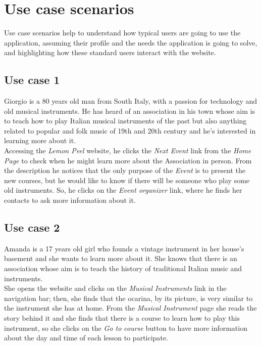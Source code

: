 \documentclass[../../DD.tex]{subfiles}
\begin{document}
	\section{Use case scenarios}
		Use case scenarios help to understand how typical users are going to use the application, assuming their profile and the needs the application is going to solve, and highlighting how these standard users interact with the website.

		\subsection{Use case 1}
		    Giorgio is a 80 years old man from South Italy, with a passion for technology and old musical instruments. He has heard of an association in his town whose aim is to teach how to play Italian musical instruments of the past but also anything related to popular and folk music of 19th and 20th century and he's interested in learning more about it.\\
			Accessing the \textit{Lemon Peel} website, he clicks the \textit{Next Event} link from the \textit{Home Page} to check when he might learn more about the Association in person. From the description he notices that the only purpose of the \textit{Event} is to present the new courses, but he would like to know if there will be someone who play some old instruments. So, he clicks on the \textit{Event organizer} link, where he finds her contacts to ask more information about it.
			

		\newpage
		\subsection{Use case 2}
			Amanda is a 17 years old girl who founds a vintage instrument in her house's basement and she wants to learn more about it. She knows that there is an association whose aim is to teach the history of traditional Italian music and instruments.\\
			She opens the website and clicks on the \textit{Musical Instruments} link in the navigation bar; then, she finds that the ocarina, by its picture, is very similar to the instrument she has at home. From the \textit{Musical Instrument} page she reads the story behind it and she finds that there is a course to learn how to play this instrument, so she clicks on the \textit{Go to course} button to have more information about the day and time of each lesson to participate.
			
\end{document}
